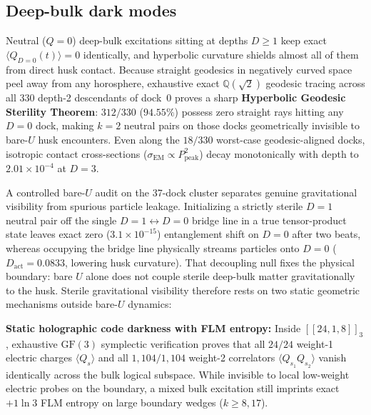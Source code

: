 \subsection{Deep-bulk dark modes}

Neutral ($Q = 0$) deep-bulk excitations sitting at depths $D \ge 1$ keep exact $\langle Q_{D=0}(t)\rangle = 0$
identically, and hyperbolic curvature shields almost all of them from direct husk contact. Because straight geodesics
in negatively curved space peel away from any horosphere, exhaustive exact $\mathbb{Q}(\sqrt{2})$ geodesic tracing
across all $330$ depth-2 descendants of dock~0 proves a sharp \textbf{Hyperbolic Geodesic Sterility Theorem}: $312/330$
($94.55\%$) possess zero straight rays hitting any $D = 0$ dock, making $k = 2$ neutral pairs on those docks
geometrically invisible to bare-$U$ husk encounters. Even along the $18/330$ worst-case geodesic-aligned docks,
isotropic contact cross-sections ($\sigma_{\mathrm{EM}} \propto P_{\mathrm{peak}}^2$) decay monotonically with depth to
$2.01 \times 10^{-4}$ at $D = 3$.

A controlled bare-$U$ audit on the 37-dock cluster separates genuine gravitational visibility from spurious particle
leakage. Initializing a strictly sterile $D = 1$ neutral pair off the single $D = 1 \leftrightarrow D = 0$ bridge line
in a true tensor-product state leaves exact zero ($3.1 \times 10^{-15}$) entanglement shift on $D = 0$ after two beats,
whereas occupying the bridge line physically streams particles onto $D = 0$ ($D_{\mathrm{act}} = 0.0833$, lowering husk
curvature). That decoupling null fixes the physical boundary: bare $U$ alone does not couple sterile deep-bulk
matter gravitationally to the husk. Sterile gravitational visibility therefore rests on two static geometric mechanisms
outside bare-$U$ dynamics:

\textbf{Static holographic code darkness with FLM entropy:} Inside $[[24, 1, 8]]_3$, exhaustive $\mathrm{GF}(3)$
symplectic verification proves that all $24/24$ weight-1 electric charges $\langle Q_s \rangle$ and all
$1{,}104/1{,}104$ weight-2 correlators $\langle Q_{s_1} Q_{s_2} \rangle$ vanish identically across the bulk logical
subspace. While invisible to local low-weight electric probes on the boundary, a mixed bulk excitation still imprints
exact $+1\ln 3$ FLM entropy \cite{faulkner2013flm} on large boundary wedges ($k \ge 8, 17$).

